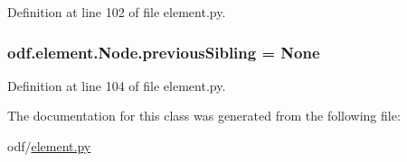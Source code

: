 Definition at line 102 of file element.\+py.

\hypertarget{classodf_1_1element_1_1Node_aa1ab10b7b12207015a51a3925bd2dd4d}{
\subsubsection[{previous\+Sibling}]{\setlength{\rightskip}{0pt plus 5cm}odf.\+element.\+Node.\+previous\+Sibling = None\hspace{0.3cm}{\ttfamily [static]}}}\label{classodf_1_1element_1_1Node_aa1ab10b7b12207015a51a3925bd2dd4d}


Definition at line 104 of file element.\+py.



The documentation for this class was generated from the following file\+:\begin{DoxyCompactItemize}
\item 
odf/\hyperlink{element_8py}{element.\+py}\end{DoxyCompactItemize}
